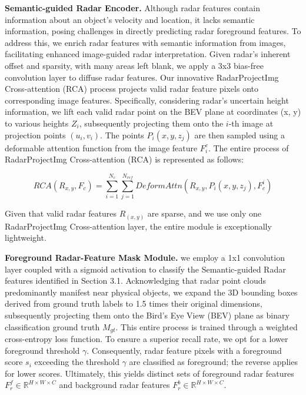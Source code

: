 \documentclass{article}
\begin{document}
\noindent \textbf{Semantic-guided Radar Encoder.} Although radar features contain information about an object's velocity and location, it lacks semantic information, posing challenges in directly predicting radar foreground features. To address this, we enrich radar features with semantic information from images, facilitating enhanced image-guided radar interpretation. Given radar's inherent offset and sparsity, with many areas left blank, we apply a 3x3 bias-free convolution layer to diffuse radar features. Our innovative RadarProjectImg Cross-attention (RCA) process projects valid radar feature pixels onto corresponding image features. Specifically, considering radar's uncertain height information, we lift each valid radar point on the BEV plane at coordinates (x, y) to various heights \(Z_i\), subsequently projecting them onto the \(i\)-th image at projection points \((u_i, v_i)\). The points \(P_i(x, y, z_j)\) are then sampled using a deformable attention function from the image feature \(F^c_i\). The entire process of RadarProjectImg Cross-attention (RCA) is represented as follows:

\[RCA(R_{x, y}, F_c) = \sum^{N_c}_{i=1} \sum^{N_{ref}}_{j=1} DeformAttn(R_{x, y}, P_i(x, y, z_j), F^i_c)\]

Given that valid radar features \(R_{(x, y)}\) are sparse, and we use only one RadarProjectImg Cross-attention layer, the entire module is exceptionally lightweight.

\noindent \textbf{Foreground Radar-Feature Mask Module.} we employ a 1x1 convolution layer coupled with a sigmoid activation to classify the Semantic-guided Radar features identified in Section 3.1. Acknowledging that radar point clouds predominantly manifest near physical objects, we expand the 3D bounding boxes derived from ground truth labels to 1.5 times their original dimensions, subsequently projecting them onto the Bird's Eye View (BEV) plane as binary classification ground truth \( M_{gt} \). This entire process is trained through a weighted cross-entropy loss function. To ensure a superior recall rate, we opt for a lower foreground threshold \( \gamma \). Consequently, radar feature pixels with a foreground score \( s_{i} \) exceeding the threshold \( \gamma \) are classified as foreground; the reverse applies for lower scores. Ultimately, this yields distinct sets of foreground radar features \( F^{f}_{r} \in \mathbb{R}^{H \times W \times C} \) and background radar features \( F^{b}_{r} \in \mathbb{R}^{H \times W \times C} \).
\end{document}
